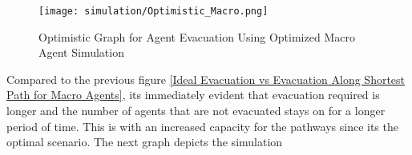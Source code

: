 \begin{figure}[H]
  \centering
  \texttt{[image: simulation/Optimistic\_Macro.png]}
  \caption{Optimistic Graph for Agent Evacuation Using Optimized Macro Agent Simulation}
  \label{Optimistic Graph for Agent Evacuation Using Optimized Macro Agent Simulation}
\end{figure}

Compared to the previous figure \ref{Ideal Evacuation vs Evacuation Along Shortest Path for Macro Agents}, its immediately evident that evacuation required is longer and the number of agents that are not evacuated stays on for a longer period of time. This is with an increased capacity for the pathways since its the optimal scenario. The next graph depicts the simulation 